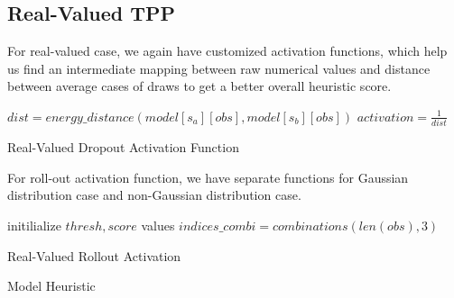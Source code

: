 \documentclass[10pt, conference, compsocconf]{IEEEtran}
\begin{document}
\subsection{Real-Valued TPP}
For real-valued case, we again have customized activation functions, which help us find an intermediate mapping between raw numerical values and distance between average cases of draws to get a better overall heuristic score. 

\begin{algorithm}[h]
$dist = {energy\_distance(model[s_a][obs], model[s_b][obs])}$ \;
$activation = \frac{1}{dist}$ \;
\caption{{\sc Real-Valued Dropout Activation Function}}
\label{algo:rdropout}
\end{algorithm}

For roll-out activation function, we have separate functions for Gaussian distribution case and non-Gaussian distribution case.

\begin{algorithm} [h]
initilialize $thresh, score$ values \;
$indices\_combi = combinations(len(obs), 3)$ \;
\caption{{\sc Real-Valued Rollout Activation}}
\label{algo:RVRolloutAct}
\end{algorithm}

\begin{algorithm} [h]
\caption{{\sc Model Heuristic}}
\label{algo:ModelHeuristic}
\end{algorithm}

\nocite{*}


\end{document}
